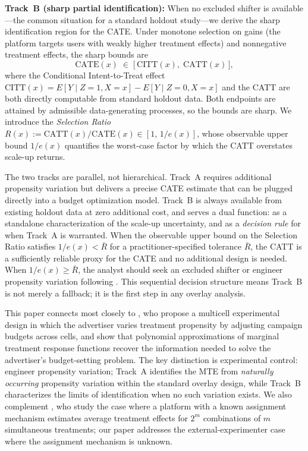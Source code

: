 \documentclass[11pt]{article}
\begin{document}
\textbf{Track~B (sharp partial identification):} When no excluded shifter is
available---the common situation for a standard holdout study---we derive the
sharp identification region for the CATE.  Under monotone selection on gains
(the platform targets users with weakly higher treatment effects) and nonnegative
treatment effects, the sharp bounds are
\[
  \mathrm{CATE}(x) \;\in\; \bigl[\,\mathrm{CITT}(x),\;\mathrm{CATT}(x)\,\bigr],
\]
where the Conditional Intent-to-Treat effect $\mathrm{CITT}(x) = E[Y\mid
Z=1,X=x] - E[Y\mid Z=0,X=x]$ and the CATT are both directly computable from
standard holdout data.  Both endpoints are attained by admissible
data-generating processes, so the bounds are sharp.  We introduce the
\emph{Selection Ratio} $R(x) := \mathrm{CATT}(x)/\mathrm{CATE}(x) \in
[1,\, 1/e(x)]$, whose observable upper bound $1/e(x)$ quantifies the worst-case
factor by which the CATT overstates scale-up returns.

The two tracks are parallel, not hierarchical.  Track~A requires additional
propensity variation but delivers a precise CATE estimate that can be plugged
directly into a budget optimization model.  Track~B is always available from
existing holdout data at zero additional cost, and serves a dual function: as a
standalone characterization of the scale-up uncertainty, and as a \emph{decision
rule} for when Track~A is warranted.  When the observable upper bound on the
Selection Ratio satisfies $1/e(x) < \bar{R}$ for a practitioner-specified
tolerance $\bar{R}$, the CATT is a sufficiently reliable proxy for the CATE and
no additional design is needed.  When $1/e(x) \geq \bar{R}$, the analyst should
seek an excluded shifter or engineer propensity variation following
\citet{waisman2025multicell}.  This sequential decision structure means Track~B
is not merely a fallback; it is the first step in any overlay analysis.

This paper connects most closely to \citet{waisman2025multicell}, who propose a
multicell experimental design in which the advertiser varies treatment propensity
by adjusting campaign budgets across cells, and show that polynomial
approximations of marginal treatment response functions recover the information
needed to solve the advertiser's budget-setting problem.  The key distinction is
experimental control: \citeauthor{waisman2025multicell} engineer propensity
variation; Track~A identifies the MTE from \emph{naturally occurring} propensity
variation within the standard overlay design, while Track~B characterizes the
limits of identification when no such variation exists.  We also complement
\citet{ye2025deep}, who study the case where a platform with a known assignment
mechanism estimates average treatment effects for $2^m$ combinations of $m$
simultaneous treatments; our paper addresses the external-experimenter case where
the assignment mechanism is unknown.
\end{document}
